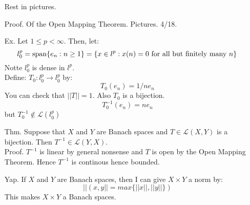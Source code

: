 \documentclass[12pt]{article}
\begin{document}
\begin{itemize}
    Rest in pictures.
    \item[Proof.] Of the Open Mapping Theorem. Pictures. 4/18.
    \item[Ex.] Let $1 \leq p < \infty$. Then, let: 
    \[ l_0^p = \operatorname{span}\{e_n : n \geq 1\} = \{x \in l^p: x(n) = 0 \text{ for all but finitely many $n$}\}\]
    Notte $l_0^p$ is dense in $l^p$. \\
    Define: $T_0: l_0^p \to l_0^p$ by:
    \[T_0(e_n) = 1/n e_n\]
    You can check that $||T|| = 1$. Also $T_0$ is a bijection. 
    \[T_0^{-1}(e_n) = ne_n\]
    but $T_0^{-1} \not\in \mathcal{L}(l_0^p)$
    \item[Thm.] Suppose that $X$ and $Y$ are Banach spaces and $T \in \mathcal{L}(X,Y)$ is a bijection. Then $T^{-1} \in \mathcal{L}(Y,X)$. \\
    Proof. $T^{-1}$ is linear by general nonsense and $T$ is open by the Open Mapping Theorem. Hence $T^{-1}$ is continous hence bounded.
    \item[Yap.] If $X$ and $Y$ are Banach spaces, then I can give $X \times Y$ a norm by: 
    \[ ||(x,y|| = max\{||x||, ||y||\})\]
    This makes $X \times Y$ a Banach spaces.
\end{itemize}
\end{document}
